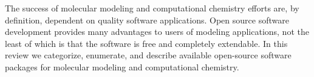 The success of molecular modeling and computational chemistry efforts are, by definition, dependent on quality software applications. Open source software development provides many advantages to users of modeling applications, not the least of which is that the software is free and completely extendable.  In this review we categorize, enumerate, and describe available open-source software packages for molecular modeling and computational chemistry.